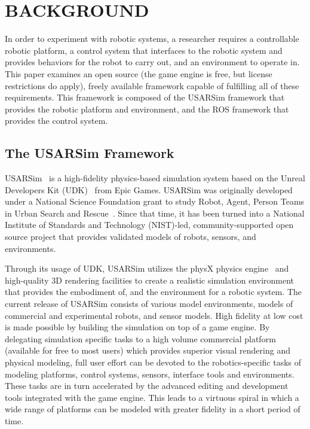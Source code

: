 \section*{BACKGROUND}
In order to experiment with robotic systems, a researcher requires a controllable robotic platform, a control system that interfaces to the robotic system and provides behaviors for the robot to carry out, and an environment to operate in.  This paper examines an open source (the game engine is free, but license restrictions do apply), freely available framework capable of fulfilling all of these requirements. This framework is composed of the USARSim framework that provides the robotic platform and environment, and the ROS framework that provides the control system.

\subsection*{The USARSim Framework}
USARSim~\cite{CARPIN.LNAI.2006,WANG.WSC.2003} is a high-fidelity physics-based simulation system based on the Unreal Developers Kit (UDK)~\cite{UDKWeb} from Epic Games. USARSim was originally developed under a National Science Foundation grant to study Robot, Agent, Person Teams in Urban Search and Rescue~\cite{LEWIS.ICHC.2003}. Since that time, it has been turned into a National Institute of Standards and Technology (NIST)-led, community-supported open source project that provides validated models of robots, sensors, and environments.


Through its usage of UDK, USARSim utilizes the physX physics engine~\cite{physXWeb} and high-quality 3D rendering facilities to create a realistic simulation environment that provides the embodiment of, and the environment for a robotic
system. The current release of USARSim consists of various model environments, models of commercial and experimental robots, and sensor models. High fidelity at low cost is made possible by building the simulation on top of a game engine. By delegating  simulation specific tasks to a high volume commercial platform (available for free to most users) which provides superior visual rendering and physical modeling, full user effort can be devoted to the robotics-specific tasks of modeling platforms, control systems, sensors, interface tools and environments. These tasks are in turn accelerated by the advanced editing and development tools integrated with the game engine. This leads to a virtuous spiral in which a wide range of platforms can be modeled with greater fidelity in a short period of time.

